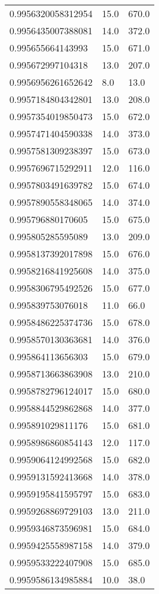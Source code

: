 \begin{center}
\begin{supertabular}[H]{p{0.30\textwidth}p{0.05\textwidth}p{0.05\textwidth}}
0.9956320058312954 & 15.0 & 670.0 \\ 
0.9956435007388081 & 14.0 & 372.0 \\ 
0.995655664143993 & 15.0 & 671.0 \\ 
0.995672997104318 & 13.0 & 207.0 \\ 
0.9956956261652642 & 8.0 & 13.0 \\ 
0.9957184804342801 & 13.0 & 208.0 \\ 
0.9957354019850473 & 15.0 & 672.0 \\ 
0.9957471404590338 & 14.0 & 373.0 \\ 
0.9957581309238397 & 15.0 & 673.0 \\ 
0.9957696715292911 & 12.0 & 116.0 \\ 
0.9957803491639782 & 15.0 & 674.0 \\ 
0.9957890558348065 & 14.0 & 374.0 \\ 
0.995796880170605 & 15.0 & 675.0 \\ 
0.995805285595089 & 13.0 & 209.0 \\ 
0.9958137392017898 & 15.0 & 676.0 \\ 
0.9958216841925608 & 14.0 & 375.0 \\ 
0.9958306795492526 & 15.0 & 677.0 \\ 
0.995839753076018 & 11.0 & 66.0 \\ 
0.9958486225374736 & 15.0 & 678.0 \\ 
0.9958570130363681 & 14.0 & 376.0 \\ 
0.995864113656303 & 15.0 & 679.0 \\ 
0.9958713663863908 & 13.0 & 210.0 \\ 
0.9958782796124017 & 15.0 & 680.0 \\ 
0.9958844529862868 & 14.0 & 377.0 \\ 
0.995891029811176 & 15.0 & 681.0 \\ 
0.9958986860854143 & 12.0 & 117.0 \\ 
0.9959064124992568 & 15.0 & 682.0 \\ 
0.9959131592413668 & 14.0 & 378.0 \\ 
0.9959195841595797 & 15.0 & 683.0 \\ 
0.9959268869729103 & 13.0 & 211.0 \\ 
0.9959346873596981 & 15.0 & 684.0 \\ 
0.9959425558987158 & 14.0 & 379.0 \\ 
0.9959533222407908 & 15.0 & 685.0 \\ 
0.9959586134985884 & 10.0 & 38.0 \\ 

\end{supertabular}
\end{center}
